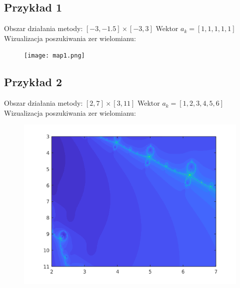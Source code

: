 \documentclass[10pt]{article}   %
\begin{document}
\subsection{Przykład 1}
Obszar działania metody: $ [-3,-1.5]\times[-3,3]$\newline
Wektor $a_k=[1,1,1,1,1]$\newline
Wizualizacja poszukiwania zer wielomianu:\newline

\begin{figure}[ht]
\begin{center}
\advance\leftskip-3cm
\advance\rightskip-3cm
\texttt{[image: map1.png]}
\end{center}\end{figure}
\newpage

\subsection{Przykład 2}
Obszar działania metody: $[2,7]\times[3,11]$\newline
Wektor $a_k=[1,2,3,4,5,6]$\newline
Wizualizacja poszukiwania zer wielomianu:\newline

\begin{figure}[ht]
\begin{center}
\advance\leftskip-3cm
\advance\rightskip-3cm
\includegraphics[keepaspectratio=true,scale=0.6]{map3.png}\newline
\end{center}\end{figure}
\newpage
\end{document}
